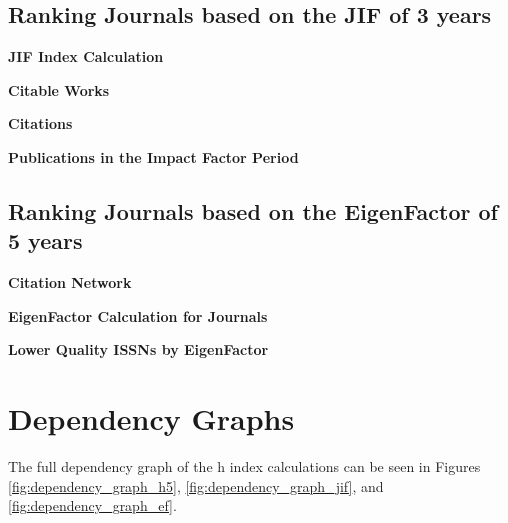 \subsection{Ranking Journals based on the JIF of 3 years}

\textbf{JIF Index Calculation}





\textbf{Citable Works}





\textbf{Citations}





\textbf{Publications in the Impact Factor Period}



\subsection{Ranking Journals based on the EigenFactor of 5 years}

\textbf{Citation Network}



\textbf{EigenFactor Calculation for Journals}



\textbf{Lower Quality ISSNs by EigenFactor}



\section{Dependency Graphs}

The full dependency graph of the h index calculations can be seen in Figures
\ref{fig:dependency_graph_h5}, \ref{fig:dependency_graph_jif}, and
\ref{fig:dependency_graph_ef}.

